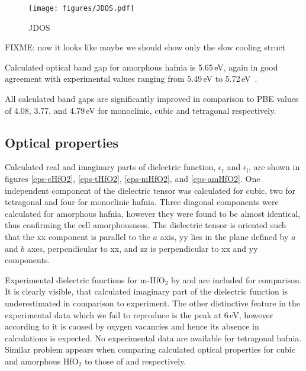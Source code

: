 \documentclass[10pt,a4paper,twocolumn]{article}
\begin{document}
\begin{figure}
\begin{center}
	\texttt{[image: figures/JDOS.pdf]}
	\caption{JDOS}
   \label{JDOS}
\end{center}
\end{figure}

FIXME: now it looks like maybe we should show only the slow cooling struct

Calculated optical band gap for amorphous hafnia is 5.65\,eV, again in good agreement with experimental values ranging from 5.49\,eV to 5.72\,eV~\cite{Takeuchi2004, Nguyen2005, Perevalov2007}.


All calculated band gaps are significantly improved in comparison to PBE values of 4.08, 3.77, and 4.79\,eV for monoclinic, cubic and tetragonal  respectively.

\subsection{Optical properties}

Calculated real and imaginary parts of dielectric function, $\epsilon_\mathrm{r}$ and $\epsilon_\mathrm{i}$, are shown in figures \ref{eps-cHfO2}, \ref{eps-tHfO2}, \ref{eps-mHfO2}, and \ref{eps-amHfO2}.
One independent component of the dielectric tensor was calculated for cubic, two for tetragonal and four for monoclinic hafnia.
Three diagonal components were calculated for amorphous hafnia, however they were found to be almost identical, thus confirming the cell amorphousness.
The dielectric tensor is oriented such that the xx component is parallel to the $a$ axis, yy lies in the plane defined by $a$ and $b$ axes, perpendicular to xx, and zz is perpendicular to xx and yy components.

Experimental dielectric functions for m-HfO$_2$ by \citet{Edwards2003} and \citet{Nguyen2005} are included for comparison.
It is clearly visible, that calculated imaginary part of the dielectric function is underestimated in comparison to experiment.
The other distinctive feature in the experimental data which we fail to reproduce is the peak at 6\,eV, however according to \cite{Takeuchi2004} it is caused by oxygen vacancies and hence its absence in calculations is expected.
No experimental data are available for tetragonal hafnia.
Similar problem appears when comparing calculated optical properties for cubic and amorphous HfO$_2$ to those of \citet{Lim2002} and \citet{Nguyen2005} respectively.
\end{document}
